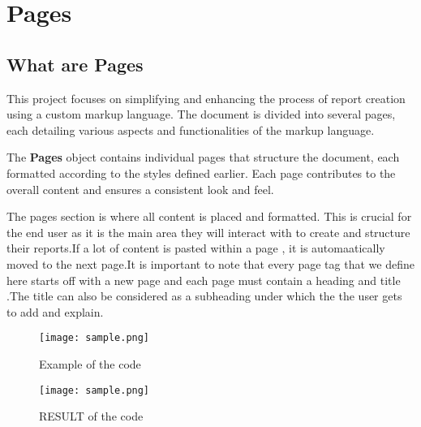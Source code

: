 \documentclass[oneside]{book}
\begin{document}
\newpage
\chapter{Pages}
\section{What are Pages}
This project focuses on simplifying and enhancing the process of report creation using a custom markup language. The document is divided into several 
            pages, each detailing various aspects and functionalities of the markup language. \par
The \textbf{Pages} object contains individual pages that structure the document, each formatted according to the styles defined earlier. Each page contributes 
            to the overall content and ensures a consistent look and feel.\par
The pages section is where all content is placed and formatted. This is crucial for the end user as it is the main area they will interact with to create 
            and structure their reports.If a lot of content is pasted within a page , it is automaatically moved to the next page.It is important to note that every page 
            tag that we define here starts off with a new page and each page must contain a heading and title .The title can also be considered as a subheading under which the
            the user gets to add and explain.\par
\begin{figure}[h]
\centering
\texttt{[image: sample.png]}
\caption{Example of the code}
\end{figure}
\begin{figure}[h]
\centering
\texttt{[image: sample.png]}
\caption{RESULT of the code}
\end{figure}
\end{document}
